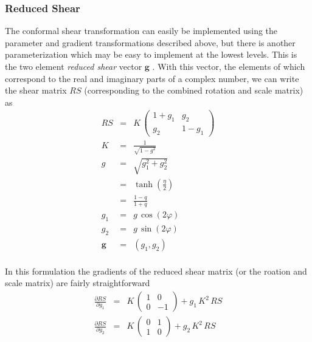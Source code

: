 \documentclass[modern]{aastex62}
\begin{document}
\subsubsection{Reduced Shear}
The conformal shear transformation can easily be implemented using the parameter and gradient transformations described above, 
but there is another parameterization which may be easy to implement at the lowest levels.
This is the two element \emph{reduced shear} vector $\pmb{g}$ \citep{bernstein02}.
With this vector, the elements of which correspond to the real and imaginary parts of a complex number, we can write the shear matrix $RS$ (corresponding to the combined rotation and scale matrix) as
\begin{eqnarray}
RS & = & K \, \begin{pmatrix} 1+g_1 & g_2 \\ g_2 & 1 - g_1 \end{pmatrix} \\
K & = & \frac{1}{\sqrt{1-g^2}} \\
g & = & \sqrt{g_1^2 + g_2^2} \\
  & = & \tanh(\frac{\eta}{2}) \\
  & = & \frac{1-q}{1+q} \\
g_1 & = & g \, \cos(2\varphi) \\
g_2 & = & g \, \sin(2\varphi) \\
\pmb{g} & = & (g_1, g_2) \\
\end{eqnarray}

In this formulation the gradients of the reduced shear matrix (or the roation and scale matrix) are fairly straightforward
\begin{eqnarray}
\frac{\partial RS}{\partial g_1} & = & K \, \begin{pmatrix} 1 & 0 \\ 0 & -1 \end{pmatrix} + g_1 \, K^2 \, RS \\
\frac{\partial RS}{\partial g_2} & = & K \, \begin{pmatrix} 0 & 1 \\ 1 & 0 \end{pmatrix} + g_2 \, K^2 \, RS
\end{eqnarray}
\end{document}
